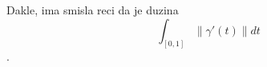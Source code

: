 \documentclass[preview]{standalone}
\begin{document}
\begin{center}
Dakle, ima smisla reci da je duzina \[\int_{[0,1]} \lVert \gamma'(t)\rVert dt\].
\end{center}
\end{document}
